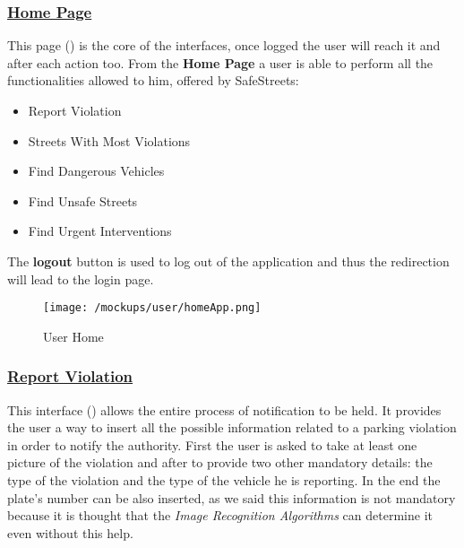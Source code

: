 			\FloatBarrier
		\subsubsection[Home Page]{\hyperlink{toc}{Home Page}}
			\label{sec:userHomePage}
			
			This page () is the core of the interfaces, once logged the user will reach it and after each action too. From the \textbf{Home Page} a user is able to perform all the functionalities allowed to him, offered by SafeStreets:
			
			\begin{itemize}
				\item Report Violation
				\item Streets With Most Violations
				\item Find Dangerous Vehicles
				\item Find Unsafe Streets
				\item Find Urgent Interventions
			\end{itemize}
		
			The \textbf{logout} button is used to log out of the application and thus the redirection will lead to the login page.\\
			
			\begin{figure}[ht!]
				\centering
				\texttt{[image: /mockups/user/homeApp.png]}
				\caption{\label{fig:homeApp} User Home}
			\end{figure}
		
			\FloatBarrier

		\subsubsection[Report Violation]{\hyperlink{toc}{Report Violation}}
			\label{sec:userReportViolation}
			
			This interface () allows the entire process of notification to be held. It provides the user a way to insert all the possible information related to a parking violation in order to notify the authority. First the user is asked to take at least one picture of the violation and after to provide two other mandatory details: the type of the violation and the type of the vehicle he is reporting. In the end the plate's number can be also inserted, as we said this information is not mandatory because it is thought that the \emph{Image Recognition Algorithms} can determine it even without this help.\\
			
